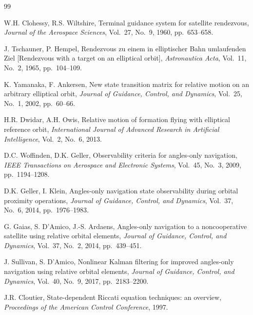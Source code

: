 \documentclass[preprint,3p,times]{elsarticle}
\begin{document}

\begin{thebibliography}{99}

W.H. Clohessy, R.S. Wiltshire,
\newblock Terminal guidance system for satellite rendezvous,
\newblock \emph{Journal of the Aerospace Sciences}, Vol.~27, No.~9, 1960, pp.~653--658.

J. Tschauner, P. Hempel,
\newblock Rendezvous zu einem in elliptischer Bahn umlaufenden Ziel [Rendezvous with a target on an elliptical orbit],
\newblock \emph{Astronautica Acta}, Vol.~11, No.~2, 1965, pp.~104--109.

K. Yamanaka, F. Ankersen,
\newblock New state transition matrix for relative motion on an arbitrary elliptical orbit,
\newblock \emph{Journal of Guidance, Control, and Dynamics}, Vol.~25, No.~1, 2002, pp.~60--66.

H.R. Dwidar, A.H. Owis,
\newblock Relative motion of formation flying with elliptical reference orbit,
\newblock \emph{International Journal of Advanced Research in Artificial Intelligence}, Vol.~2, No.~6, 2013.

D.C. Woffinden, D.K. Geller,
\newblock Observability criteria for angles-only navigation,
\newblock \emph{IEEE Transactions on Aerospace and Electronic Systems}, Vol.~45, No.~3, 2009, pp.~1194--1208.

D.K. Geller, I. Klein,
\newblock Angles-only navigation state observability during orbital proximity operations,
\newblock \emph{Journal of Guidance, Control, and Dynamics}, Vol.~37, No.~6, 2014, pp.~1976--1983.

G. Gaias, S. D'Amico, J.-S. Ardaens,
\newblock Angles-only navigation to a noncooperative satellite using relative orbital elements,
\newblock \emph{Journal of Guidance, Control, and Dynamics}, Vol.~37, No.~2, 2014, pp.~439--451.

J. Sullivan, S. D'Amico,
\newblock Nonlinear Kalman filtering for improved angles-only navigation using relative orbital elements,
\newblock \emph{Journal of Guidance, Control, and Dynamics}, Vol.~40, No.~9, 2017, pp.~2183--2200.

J.R. Cloutier,
\newblock State-dependent Riccati equation techniques: an overview,
\newblock \emph{Proceedings of the American Control Conference}, 1997.


\end{thebibliography}
\end{document}
